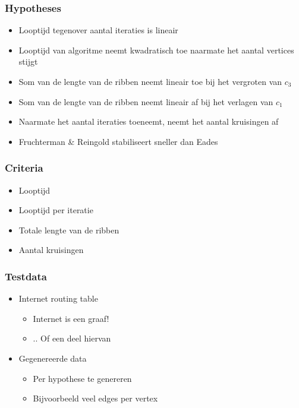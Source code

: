\documentclass[16pt]{beamer}
\begin{document}
\begin{frame}
    \frametitle{Hypotheses}
    \begin{itemize}
        \item{Looptijd tegenover aantal iteraties is lineair}
        \item{Looptijd van algoritme neemt kwadratisch toe naarmate het aantal vertices stijgt}
        \item{Som van de lengte van de ribben neemt lineair toe bij het vergroten van $c_3$}
        \item{Som van de lengte van de ribben neemt lineair af bij het verlagen van $c_1$}
        \item{Naarmate het aantal iteraties toeneemt, neemt het aantal kruisingen af}
        \item{Fruchterman \& Reingold stabiliseert sneller dan Eades}
    \end{itemize}
\end{frame}

\begin{frame}
    \frametitle{Criteria}
    \begin{itemize}
        \item{Looptijd}
        \item{Looptijd per iteratie}
        \item{Totale lengte van de ribben}
        \item{Aantal kruisingen}
    \end{itemize}
\end{frame}

\begin{frame}
    \frametitle{Testdata}
    \begin{itemize}
        \item{Internet routing table}
        \begin{itemize}
            \item{Internet is een graaf!}
            \item{.. Of een deel hiervan}
        \end{itemize}
        \item{Gegenereerde data}
        \begin{itemize}
            \item{Per hypothese te genereren}
            \item{Bijvoorbeeld veel edges per vertex}
        \end{itemize}
    \end{itemize}
\end{frame}
\end{document}
